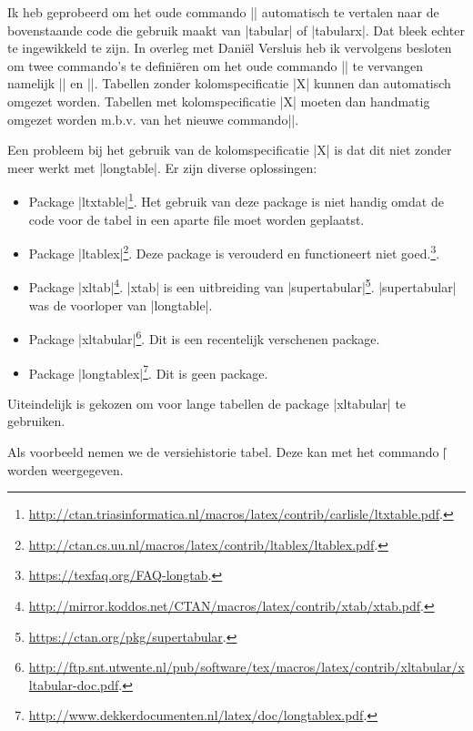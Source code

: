 \begin{llstShortInline}
	Ik heb geprobeerd om het oude commando |\tabel| automatisch te vertalen naar de bovenstaande code die gebruik maakt van |tabular| of |tabularx|.
	Dat bleek echter te ingewikkeld te zijn.
	In overleg met Daniël Versluis heb ik vervolgens besloten om twee commando's te definiëren om het oude commando |\tabel| te vervangen namelijk |\tabel| en |\tabelX|.
	Tabellen zonder kolomspecificatie |X| kunnen dan automatisch omgezet worden.
	Tabellen met kolomspecificatie |X| moeten dan handmatig omgezet worden m.b.v. van het nieuwe commando|\tabelX|.
	
	Een probleem bij het gebruik van de kolomspecificatie |X| is dat dit niet zonder meer werkt met |longtable|. Er zijn diverse oplossingen:
	\begin{itemize}
		\item Package |ltxtable|\footnote{%
			\url{http://ctan.triasinformatica.nl/macros/latex/contrib/carlisle/ltxtable.pdf}.
		}. Het gebruik van deze package is niet handig omdat de code voor de tabel in een aparte file moet worden geplaatst.
		\item Package |ltablex|\footnote{%
			\url{http://ctan.cs.uu.nl/macros/latex/contrib/ltablex/ltablex.pdf}.
		}. Deze package is verouderd en functioneert niet goed.\footnote{%
			\url{https://texfaq.org/FAQ-longtab}.
		}.
		\item Package |xltab|\footnote{%
			\url{http://mirror.koddos.net/CTAN/macros/latex/contrib/xtab/xtab.pdf}.
		}. |xtab| is een uitbreiding van |supertabular|\footnote{%
			\url{https://ctan.org/pkg/supertabular}.
		}. |supertabular| was de voorloper van |longtable|.
		\item Package |xltabular|\footnote{%
			\url{http://ftp.snt.utwente.nl/pub/software/tex/macros/latex/contrib/xltabular/xltabular-doc.pdf}.
		}. Dit is een recentelijk verschenen package.
		\item Package |longtablex|\footnote{%
			\url{http://www.dekkerdocumenten.nl/latex/doc/longtablex.pdf}.
		}. Dit is geen  package.
	\end{itemize}
	
	Uiteindelijk is gekozen om voor lange tabellen de package |xltabular| te gebruiken.
	
	Als voorbeeld nemen we de versiehistorie tabel. Deze kan met het commando |\|{\lstlcs{}} worden weergegeven.
	
	

\end{llstShortInline}
